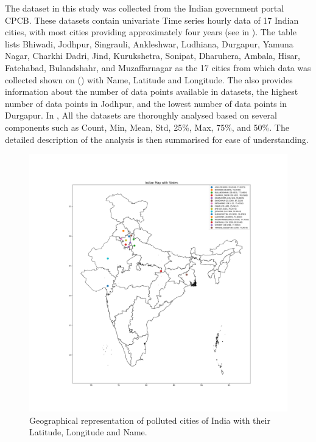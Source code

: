 \documentclass[a4paper, fleqn]{cas-sc}
\theoremstyle{definition}
\theoremstyle{remark}
\begin{document}
The dataset in this study was collected from the Indian government portal CPCB. These datasets contain univariate Time series hourly data of 17 Indian cities,  with most cities providing approximately four years (see in ). The table lists Bhiwadi,  Jodhpur,  Singrauli,  Ankleshwar,  Ludhiana,  Durgapur,  Yamuna Nagar,  Charkhi Dadri,  Jind,  Kurukshetra,  Sonipat,  Dharuhera,  Ambala,  Hisar,  Fatehabad,  Bulandshahr,  and Muzaffarnagar as the 17 cities from which data was collected shown on () with Name,  Latitude and Longitude. The  also provides information about the number of data points available in datasets, the highest number of data points in Jodhpur, and the lowest number of data points in Durgapur. In , All the datasets are thoroughly analysed based on several components such as Count, Min,  Mean,  Std,   25\%, Max,  75\%,  and 50\%. The detailed description of the analysis is then summarised for ease of understanding.
\begin{figure}[h!]
	\centering
		\includegraphics[scale=0.3]{india_map}
	  \caption{Geographical representation of polluted cities of India with their Latitude,  Longitude and Name. }\label{India map}
\end{figure}
\end{document}
